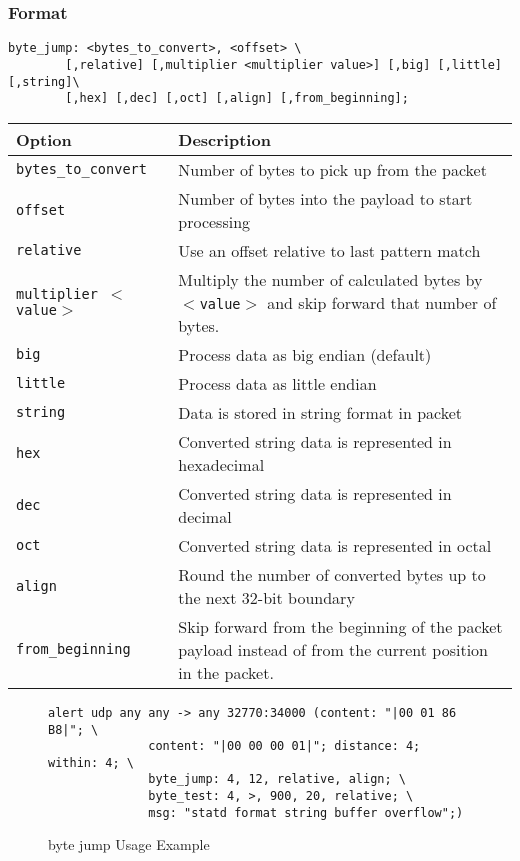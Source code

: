 \documentclass[english]{report}
\begin{document}
\subsubsection{Format}

\begin{verbatim}
byte_jump: <bytes_to_convert>, <offset> \
        [,relative] [,multiplier <multiplier value>] [,big] [,little][,string]\
        [,hex] [,dec] [,oct] [,align] [,from_beginning];
\end{verbatim}

\begin{tabular}{| l | p{5in} |}
\hline
{\bf Option} & {\bf Description}\\
\hline
\hline
\texttt{bytes\_to\_convert} & Number of bytes to pick up from the packet\\
\hline
\texttt{offset} & Number of bytes into the payload to start processing\\
\hline
\texttt{relative} & Use an offset relative to last pattern match\\
\hline
\texttt{multiplier $<$value$>$} & Multiply the number of calculated bytes by
\texttt{$<$value$>$} and skip forward that number of bytes.\\
\hline
\texttt{big} & Process data as big endian (default)\\
\hline
\texttt{little} & Process data as little endian\\
\hline
\texttt{string} & Data is stored in string format in packet\\
\hline
\texttt{hex} & Converted string data is represented in hexadecimal\\
\hline
\texttt{dec} & Converted string data is represented in decimal\\
\hline
\texttt{oct} & Converted string data is represented in octal\\
\hline
\texttt{align} & Round the number of converted bytes up to the next 32-bit boundary\\
\hline
\texttt{from\_beginning} & Skip forward from the beginning of the packet payload instead of from the
current position in the packet.\\
\hline
\end{tabular}

\begin{figure}[!hbpt]
\begin{verbatim}
alert udp any any -> any 32770:34000 (content: "|00 01 86 B8|"; \
              content: "|00 00 00 01|"; distance: 4; within: 4; \
              byte_jump: 4, 12, relative, align; \
              byte_test: 4, >, 900, 20, relative; \
              msg: "statd format string buffer overflow";)
\end{verbatim}
\caption{byte jump Usage Example \label{fig:byte_jump}}
\end{figure}
\end{document}
